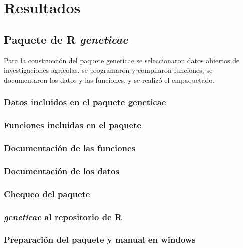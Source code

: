 \chapter{Resultados}
\section{Paquete de R \emph{geneticae}}
Para la construcción del paquete geneticae se seleccionaron datos abiertos de investigaciones agrícolas, se programaron y compilaron funciones, se documentaron los datos y las funciones, y se realizó el empaquetado.


\subsection{Datos incluidos en el paquete geneticae}


\subsection{Funciones incluidas en el paquete}

\subsection{Documentación de las funciones}

\subsection{Documentación de los datos}

\subsection{Chequeo del paquete}

\subsection{\emph{geneticae} al repositorio de R}

\subsection{Preparación del paquete y manual en windows}

